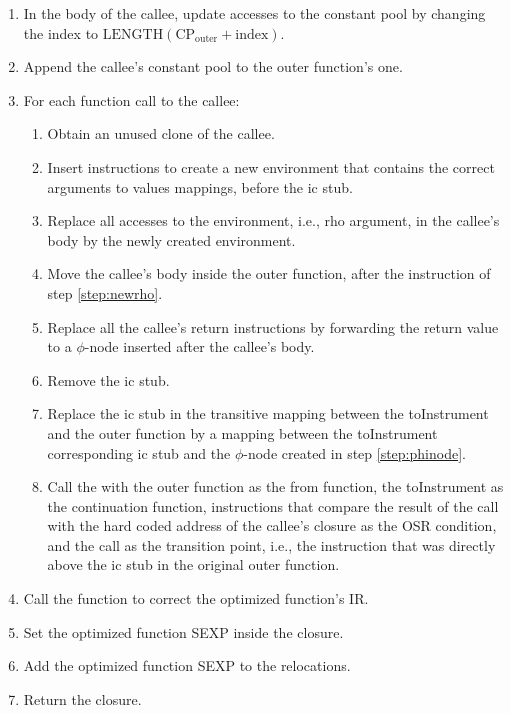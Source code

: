 \begin{enumerate}
    \item In the body of the callee, update accesses to the constant pool by changing the index to $\text{LENGTH}(\text{CP}_{\text{outer}} + \text{index})$.
    \item Append the callee's constant pool to the outer function's one.
    \item For each function call to the callee:
        \begin{enumerate}
            \item Obtain an unused clone of the callee.
            \item Insert instructions to create a new environment that contains the correct arguments to values mappings, before the ic stub.\label{step:newrho}
            \item Replace all accesses to the environment, i.e., rho argument, in the callee's body by the newly created environment.
            \item Move the callee's body inside the outer function, after the instruction of step \ref{step:newrho}.
            \item Replace all the callee's return instructions by forwarding the return value to a $\phi$-node inserted after the callee's body.\label{step:phinode}
            \item Remove the ic stub.
            \item Replace the ic stub in the transitive mapping between the toInstrument and the outer function by a mapping between the toInstrument corresponding ic stub and the $\phi$-node created in step \ref{step:phinode}.\label{step:updatemap}
            \item Call the  with the outer function as the from function, the toInstrument as the continuation function, instructions that compare the result of the  call with the hard coded address of the callee's closure as the OSR condition, and the  call as the transition point, i.e., the instruction that was directly above the ic stub in the original outer function.
        \end{enumerate}
    \item Call the  function to correct the optimized function's IR.
    \item Set the optimized function SEXP inside the closure.
    \item Add the optimized function SEXP to the relocations.
    \item Return the closure.
\end{enumerate}

